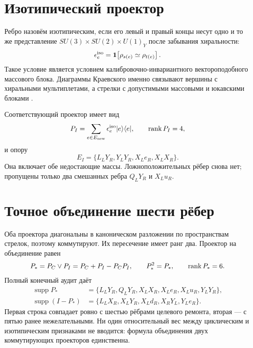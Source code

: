 \section{Изотипический проектор}

Ребро назовём изотипическим, если его левый и правый концы несут одно и то
же представление $SU(3)\times SU(2)\times U(1)_Y$ после забывания
хиральности:
\begin{equation}
 \epsilon_e^{\rm iso}
 =\mathbf1\!\left[\rho_{s(e)}\simeq\rho_{t(e)}\right].
 \label{eq:v7-edge-projector-isotypic-indicator}
\end{equation}
Такое условие является условием калибровочно-инвариантного
вектороподобного массового блока. Диаграммы Краевского именно связывают
вершины с хиральными мультиплетами, а стрелки с допустимыми массовыми и
юкавскими блоками \cite{v7-edge-projector-krajewski,v7-edge-projector-jureit}.

Соответствующий проектор имеет вид
\begin{equation}
 P_I=\sum_{e\in E_{\rm new}}\epsilon_e^{\rm iso}|e\rangle\langle e|,
 \qquad \operatorname{rank} P_I=4,
 \label{eq:v7-edge-projector-isotypic}
\end{equation}
и опору
\begin{equation}
 E_I=\{L_LY_R,Y_LY_R,X_Le_R,X_LX_R\}.
 \label{eq:v7-edge-projector-isotypic-support}
\end{equation}
Она включает обе недостающие массы. Ложноположительных рёбер снова нет;
пропущены только два смешанных ребра $Q_LY_R$ и $X_Lu_R$.

\section{Точное объединение шести рёбер}

Оба проектора диагональны в каноническом разложении по пространствам
стрелок, поэтому коммутируют. Их пересечение имеет ранг два. Проектор на
объединение равен
\begin{equation}
 P_*=P_C\vee P_I=P_C+P_I-P_CP_I,
 \qquad P_*^2=P_*,\qquad \operatorname{rank} P_*=6.
 \label{eq:v7-edge-projector-union}
\end{equation}
Полный конечный аудит даёт
\begin{align}
 \operatorname{supp}P_*
 &=\{L_LY_R,Q_LY_R,X_LX_R,X_Le_R,X_Lu_R,Y_LY_R\},
 \nonumber\\
 \operatorname{supp}(I-P_*)
 &=\{L_LX_R,X_LY_R,X_Ld_R,X_RY_L,Y_Le_R\}.
 \label{eq:v7-edge-projector-exact-partition}
\end{align}
Первая строка совпадает ровно с шестью рёбрами целевого ремонта, вторая ---
с пятью ранее нежелательными. Ни один относительный вес между циклическим и
изотипическим признаками не вводится: формула объединения двух коммутирующих
проекторов единственна.

